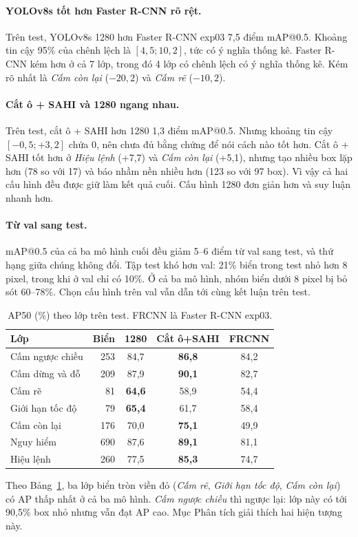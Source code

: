 \paragraph{YOLOv8s tốt hơn Faster R-CNN rõ rệt.}
Trên test, YOLOv8s 1280 hơn Faster R-CNN exp03 7,5 điểm mAP@0.5. Khoảng tin cậy 95\% của chênh lệch là $[4{,}5; 10{,}2]$, tức có ý nghĩa thống kê.
Faster R-CNN kém hơn ở cả 7 lớp, trong đó 4 lớp có chênh lệch có ý nghĩa thống kê. Kém rõ nhất là \textit{Cấm còn lại} ($-20{,}2$) và \textit{Cấm rẽ} ($-10{,}2$).

\paragraph{Cắt ô + SAHI và 1280 ngang nhau.}
Trên test, cắt ô + SAHI hơn 1280 1,3 điểm mAP@0.5. Nhưng khoảng tin cậy $[-0{,}5; +3{,}2]$ chứa 0, nên chưa đủ bằng chứng để nói cách nào tốt hơn.
Cắt ô + SAHI tốt hơn ở \textit{Hiệu lệnh} (+7,7) và \textit{Cấm còn lại} (+5,1), nhưng tạo nhiều box lặp hơn (78 so với 17) và báo nhầm nền nhiều hơn (123 so với 97 box).
Vì vậy cả hai cấu hình đều được giữ làm kết quả cuối. Cấu hình 1280 đơn giản hơn và suy luận nhanh hơn.

\paragraph{Từ val sang test.}
mAP@0.5 của cả ba mô hình cuối đều giảm 5--6 điểm từ val sang test, và thứ hạng giữa chúng không đổi.
Tập test khó hơn val: 21\% biển trong test nhỏ hơn 8 pixel, trong khi ở val chỉ có 10\%. Ở cả ba mô hình, nhóm biển dưới 8 pixel bị bỏ sót 60--78\%.
Chọn cấu hình trên val vẫn dẫn tới cùng kết luận trên test.

\begin{table}[t]
\centering
\small
\begin{tabular}{lrccc}
\toprule
Lớp & Biển & 1280 & Cắt ô+SAHI & FRCNN \\
\midrule
Cấm ngược chiều & 253 & 84,7 & \textbf{86,8} & 84,2 \\
Cấm dừng và đỗ  & 209 & 87,9 & \textbf{90,1} & 82,7 \\
Cấm rẽ          &  81 & \textbf{64,6} & 58,9 & 54,4 \\
Giới hạn tốc độ &  79 & \textbf{65,4} & 61,7 & 58,4 \\
Cấm còn lại     & 176 & 70,0 & \textbf{75,1} & 49,9 \\
Nguy hiểm       & 690 & 87,6 & \textbf{89,1} & 81,1 \\
Hiệu lệnh       & 260 & 77,5 & \textbf{85,3} & 74,7 \\
\bottomrule
\end{tabular}
\caption{AP50 (\%) theo lớp trên test. FRCNN là Faster R-CNN exp03.}
\label{tab:per-class-test}
\end{table}

Theo Bảng~\ref{tab:per-class-test}, ba lớp biển tròn viền đỏ (\textit{Cấm rẽ}, \textit{Giới hạn tốc độ}, \textit{Cấm còn lại}) có AP thấp nhất ở cả ba mô hình. \textit{Cấm ngược chiều} thì ngược lại: lớp này có tới 90,5\% box nhỏ nhưng vẫn đạt AP cao. Mục Phân tích giải thích hai hiện tượng này.
